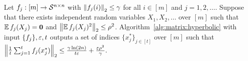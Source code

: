 \begin{theorem}\label{thm:hypercosine:main}
Let $f_j:[m] \to \mathcal{S}^{n\times n}$ with $\left\|f_j(i)\right\|_2 \leq \gamma$ for all $i\in{[m]}$ and $j=1,2,\ldots$. Suppose that there exists independent random variables $X_1,X_2,\ldots $ over $[m]$ such that $\operatorname{\mathbb{E}}{f_j(X_j)}=\mathbf{0}$ and $\left\|\operatorname{\mathbb{E}} f_j(X_j)^2 \right\|_2 \leq \rho^2$. Algorithm~\ref{alg:matrix:hyperbolic} with input $\{f_j\},\varepsilon, t$ outputs a set of indices $\{x_j^*\}_{j\in{[t]}}$ over $[m]$ such that $ \left\| \frac1{t}\sum_{j=1}^{t} f_j(x_j^*)\right\|_2 \leq \frac{ \gamma \ln (2n)}{t\varepsilon} +  \frac{\varepsilon \rho^2}{\gamma}.$
\end{theorem}
